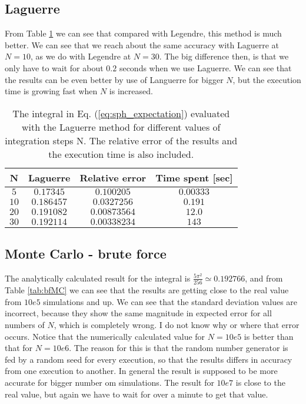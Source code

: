 \documentclass[12pt]{article}
\begin{document}
\begin{flushleft}
\subsection{Laguerre}
From Table \ref{tab:laguerre} we can see that compared with Legendre, this method is much better. We can see that we reach about the same accuracy with Laguerre at $N=10$, as we do with Legendre at $N = 30$. The big difference then, is that we only have to wait for about $0.2$ seconds when we use Laguerre. We can see that the results can be even better by use of Languerre for bigger $N$, but the execution time is growing fast when $N$ is increased. 
\vspace{5mm}
\begin{table}[!h]
\begin{center}
\begin{tabular}{| c | c | c | c |}
	\hline
	\textbf{N}  & \textbf{Laguerre} &  \textbf{Relative error} & \textbf{Time spent [sec]}\\
	\hline		
	$5$ & $0.17345$ & $0.100205$ & $0.00333$ \\
    $10$ & $0.186457$ & $0.0327256$ & $0.191$\\
    $20$ & $0.191082$ & $0.00873564$ & $12.0$\\
    $30$ & $0.192114$ & $0.00338234$ & $143$\\
  \hline
\end{tabular}
\end{center}
\caption{\label{tab:laguerre}The integral in Eq. (\ref{eq:sph_expectation}) evaluated with the Laguerre method for different values of integration steps N. The relative error of the results and the execution time is also included.}
\end{table}

\subsection{Monte Carlo - brute force}
The analytically calculated result for the integral is $\frac{5\pi^2}{256}\simeq 0.192766$, and from Table \ref{tab:bfMC} we can see that the results are getting close to the real value from $10e5$ simulations and up. We can see that the standard deviation values are incorrect, because they show the same magnitude in expected error for all numbers of $N$, which is completely wrong. I do not know why or where that error occurs. Notice that the numerically calculated value for $N=10e5$ is better than that for $N=10e6$. The reason for this is that the random number generator is fed by a random seed for every execution, so that the results differs in accuracy from one execution to another. In general the result is supposed to be more accurate for bigger number om simulations. The result for $10e7$ is close to the real value, but again we have to wait for over a minute to get that value.


\end{flushleft}
\end{document}
